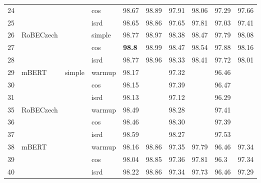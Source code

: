 \begin{table}[!h]
{\begin{tabular}{|l|l|l|l||llllll|}
24 &                              &                         & cos    & 98.67  & 98.89   & 97.91   & 98.06    & 97.29     & 97.66      \\ \cline{1-1} \cline{4-10}
25 &                              &                         & isrd   & 98.65  & 98.86   & 97.65   & 97.81    & 97.03     & 97.41      \\ \cline{1-2} \cline{4-10}
26 & \multirow{3}{*}{RoBECzech}   &                         & simple & 98.77  & 98.97   & 98.38   & 98.47    & 97.79     & 98.08      \\ \cline{1-1} \cline{4-10}
27 &                              &                         & cos    & \textbf{98.8}   & 98.99   & 98.47   & 98.54    & 97.88     & 98.16      \\ \cline{1-1} \cline{4-10}
28 &                              &                         & isrd   & 98.77  & 98.96   & 98.33   & 98.41    & 97.72     & 98.01      \\ \hline
29 & \multirow{3}{*}{mBERT}       & \multirow{9}{*}{simple} & warmup & 98.17  &         & 97.32   &          & 96.46     &            \\ \cline{1-1} \cline{4-10}
30 &                              &                         & cos    & 98.15  &         & 97.39   &          & 96.47     &            \\ \cline{1-1} \cline{4-10}
31 &                              &                         & isrd   & 98.13  &         & 97.12   &          & 96.29     &            \\ \cline{1-2} \cline{4-10}
35 & \multirow{3}{*}{RoBECzech}   &                         & warmup & 98.49  &         & 98.28   &          & 97.41     &            \\ \cline{1-1} \cline{4-10}
36 &                              &                         & cos    & 98.46  &         & 98.30   &          & 97.39     &            \\ \cline{1-1} \cline{4-10}
37 &                              &                         & isrd   & 98.59  &         & 98.27   &          & 97.53     &            \\ \hline
38 & \multirow{3}{*}{mBERT}       & \multirow{9}{*}{full}   & warmup & 98.16  & 98.86   & 97.35   & 97.79    & 96.46     & 97.34      \\ \cline{1-1} \cline{4-10}
39 &                              &                         & cos    & 98.04  & 98.85   & 97.36   & 97.81    & 96.3      & 97.34      \\ \cline{1-1} \cline{4-10}
40 &                              &                         & isrd   & 98.22  & 98.86   & 97.34   & 97.73    & 96.46     & 97.29      \\ \cline{1-2} \cline{4-10}

\end{tabular}}
\end{table}
